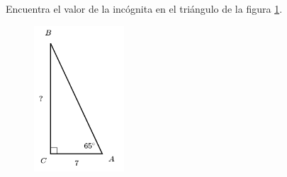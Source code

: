 Encuentra el valor de la incógnita en el triángulo de la figura \ref{fig:lados_functrig_24}.
\begin{figure}[H]
    \begin{center}
        \includegraphics[width=0.3\textwidth]{../images/lados_functrig_24.png}
    \end{center}
    \caption{}
    \label{fig:lados_functrig_24}
\end{figure}